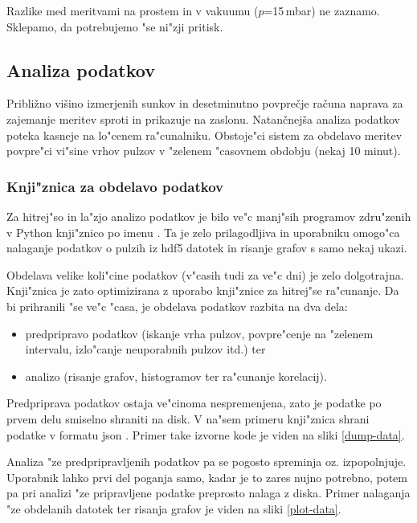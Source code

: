 \documentclass[11pt,a4paper]{article}
\begin{document}
Razlike med meritvami na prostem in v vakuumu ($p$=15\,mbar) ne zaznamo. Sklepamo, da potrebujemo "se ni"zji pritisk.

\subsection{Analiza podatkov}

Približno višino izmerjenih sunkov in desetminutno povprečje računa naprava za zajemanje meritev sproti in prikazuje na zaslonu. 
Natančnejša analiza podatkov poteka kasneje na lo"cenem ra"cunalniku.  Obstoje"ci sistem za obdelavo meritev povpre"ci vi"sine vrhov pulzov v "zelenem "casovnem obdobju (nekaj 10 minut).


\subsubsection{Knji"znica za obdelavo podatkov}
Za hitrej"so in la"zjo analizo podatkov je bilo ve"c manj"sih programov zdru"zenih v Python knji"znico po imenu . Ta je zelo prilagodljiva in uporabniku omogo"ca nalaganje podatkov o pulzih iz hdf5 \cite{hdf5} datotek in risanje grafov s samo nekaj ukazi.

Obdelava velike koli"cine podatkov (v"casih tudi za ve"c dni) je zelo dolgotrajna. Knji"znica  je zato optimizirana z uporabo knji"znice  za hitrej"se ra"cunanje. Da bi prihranili "se ve"c "casa, je obdelava podatkov razbita na dva dela:
\begin{itemize}
	\item predpripravo podatkov (iskanje vrha pulzov, povpre"cenje na "zelenem intervalu, izlo"canje neuporabnih pulzov itd.) ter
	\item analizo (risanje grafov, histogramov ter ra"cunanje korelacij).
\end{itemize}

Predpriprava podatkov ostaja ve"cinoma nespremenjena, zato je podatke po prvem delu smiselno shraniti na disk. V na"sem primeru knji"znica shrani podatke v formatu json \cite{json}. Primer take izvorne kode je viden na sliki \ref{dump-data}.

Analiza "ze predpripravljenih podatkov pa se pogosto spreminja oz. izpopolnjuje. Uporabnik lahko prvi del poganja samo, kadar je to zares nujno potrebno, potem pa pri analizi "ze pripravljene podatke preprosto nalaga z diska. Primer nalaganja "ze obdelanih datotek ter risanja grafov je viden na sliki \ref{plot-data}.
\end{document}
